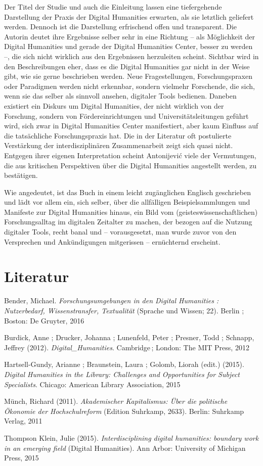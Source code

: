 \documentclass[a4paper,
fontsize=11pt,
oneside,
numbers=noperiodatend,
parskip=half-,
bibliography=totoc,
final
]{scrartcl}
\begin{document}
Der Titel der Studie und auch die Einleitung lassen eine tiefergehende
Darstellung der Praxis der Digital Humanities erwarten, als sie
letztlich geliefert werden. Dennoch ist die Darstellung erfrischend
offen und transparent. Die Autorin deutet ihre Ergebnisse selber sehr in
eine Richtung -- als Möglichkeit der Digital Humanities und gerade der
Digital Humanities Center, besser zu werden --, die sich nicht wirklich
aus den Ergebnissen herzuleiten scheint. Sichtbar wird in den
Beschreibungen eher, dass es die Digital Humanities gar nicht in der
Weise gibt, wie sie gerne beschrieben werden. Neue Fragestellungen,
Forschungspraxen oder Paradigmen werden nicht erkennbar, sondern
vielmehr Forschende, die sich, wenn sie das selber als sinnvoll ansehen,
digitaler Tools bedienen. Daneben existiert ein Diskurs um Digital
Humanities, der nicht wirklich von der Forschung, sondern von
Fördereinrichtungen und Universitätsleitungen geführt wird, sich zwar in
Digital Humanities Center manifestiert, aber kaum Einfluss auf die
tatsächliche Forschungspraxis hat. Die in der Literatur oft postulierte
Verstärkung der interdisziplinären Zusammenarbeit zeigt sich quasi
nicht. Entgegen ihrer eigenen Interpretation scheint Antonijević viele
der Vermutungen, die aus kritischen Perspektiven über die Digital
Humanities angestellt werden, zu bestätigen.

Wie angedeutet, ist das Buch in einem leicht zugänglichen Englisch
geschrieben und lädt vor allem ein, sich selber, über die allfälligen
Beispielsammlungen und Manifeste zur Digital Humanities hinaus, ein Bild
vom (geisteswissenschaftlichen) Forschungsalltag im digitalen Zeitalter
zu machen, der bezogen auf die Nutzung digitaler Tools, recht banal und
-- vorausgesetzt, man wurde zuvor von den Versprechen und Ankündigungen
mitgerissen -- ernüchternd erscheint.

\section*{Literatur}\label{literatur}

Bender, Michael. \emph{Forschungsumgebungen in den Digital Humanities :
Nutzerbedarf, Wissenstransfer, Textualität} (Sprache und Wissen; 22).
Berlin ; Boston: De Gruyter, 2016

Burdick, Anne ; Drucker, Johanna ; Lunenfeld, Peter ; Presner, Todd ;
Schnapp, Jeffrey (2012). \emph{Digital\_Humanities}. Cambridge\,;
London: The MIT Press, 2012

Hartsell-Gundy, Arianne ; Braunstein, Laura ; Golomb, Liorah (edit.)
(2015). \emph{Digital Humanities in the Library: Challenges and
Opportunities for Subject Specialists}. Chicago: American Library
Association, 2015

Münch, Richard (2011). \emph{Akademischer Kapitalismus: Über die
politische Ökonomie der Hochschulreform} (Edition Suhrkamp, 2633).
Berlin: Suhrkamp Verlag, 2011

Thompson Klein, Julie (2015). \emph{Interdisciplining digital
humanities: boundary work in an emerging field} (Digital Humanities).
Ann Arbor: University of Michigan Press, 2015

\end{document}
